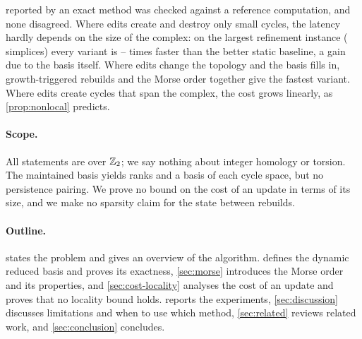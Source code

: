 \begin{enumerate}[label=(\roman*),leftmargin=2.2em]
  reported by an exact method was checked against a reference computation, and
  none disagreed. Where edits create and destroy only small cycles, the latency
  hardly depends on the size of the complex: on the largest refinement instance
  (\NumWTwoNThirtyThreeSEightSize{} simplices) every variant is
  \NumMainWTwoLargestSpeedupMin--\NumMainWTwoLargestSpeedupMax{} times faster
  than the better static baseline, a gain due to the basis itself. Where edits
  change the topology and the basis fills in, growth-triggered rebuilds and the
  Morse order together give the fastest variant. Where edits create cycles that
  span the complex, the cost grows linearly, as \cref{prop:nonlocal} predicts.
\end{enumerate}

\paragraph{Scope.}
All statements are over $\mathbb{Z}_2$; we say nothing about integer homology or torsion.
The maintained basis yields ranks and a basis of each cycle space, but no
persistence pairing. We prove no bound on the cost of an update in terms of its
size, and we make no sparsity claim for the state between rebuilds.

\paragraph{Outline.}
 states the problem and gives an overview of the algorithm.
 defines the dynamic reduced basis and proves its exactness,
\cref{sec:morse} introduces the Morse order and its properties, and
\cref{sec:cost-locality} analyses the cost of an update and proves that no
locality bound holds.  reports the experiments,
\cref{sec:discussion} discusses limitations and when to use which method,
\cref{sec:related} reviews related work, and \cref{sec:conclusion} concludes.
